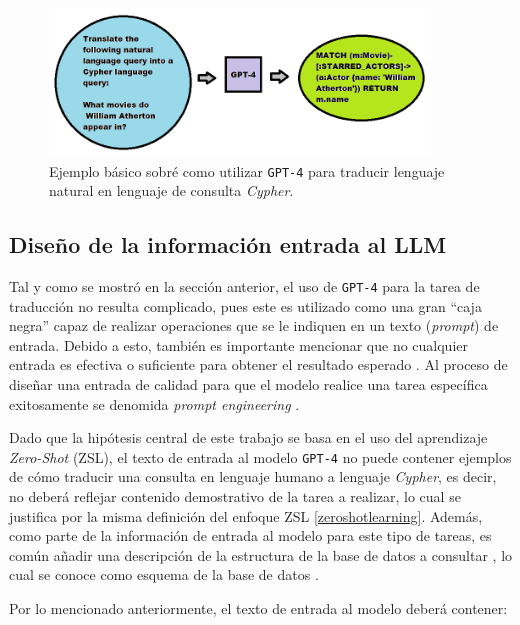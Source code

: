\begin{figure}[H]\label{simplegpt4}
	\centering
	\includegraphics[width = 0.9\textwidth]{./Graphics/simplegpt4use}
	\caption{Ejemplo básico sobré como utilizar \texttt{GPT-4} para traducir lenguaje natural en lenguaje de consulta \textit{Cypher}.}
\end{figure}

\subsection{Diseño de la información entrada al LLM} \label{prompt_design}

Tal y como se mostró en la sección anterior, el uso de \texttt{GPT-4} para la tarea de traducción no resulta complicado, pues este es utilizado como una gran ``caja negra'' capaz de realizar operaciones que se le indiquen en un texto (\textit{prompt}) de entrada. Debido a esto, también es importante mencionar que no cualquier entrada es efectiva o suficiente para obtener el resultado esperado \cite{promtpengineeringeffectiveness}. Al proceso de diseñar una entrada de calidad para que el modelo realice una tarea específica exitosamente se denomida \textit{prompt engineering} \cite{promptengineering}. 

Dado que la hipótesis central de este trabajo se basa en el uso del aprendizaje \textit{Zero-Shot} (ZSL), el texto de entrada al modelo \texttt{GPT-4} no puede contener ejemplos de cómo traducir una consulta en lenguaje humano a lenguaje \textit{Cypher}, es decir, no deberá reflejar contenido demostrativo de la tarea a realizar, lo cual se justifica por la misma definición del enfoque ZSL \ref{zeroshotlearning}. Además, como parte de la información de entrada al modelo para este tipo de tareas, es común añadir una descripción de la estructura de la base de datos a consultar \cite{samplepromptsnl2ql1} \cite{samplepromptsnl2ql2}, lo cual se conoce como esquema de la base de datos \cite{dbschema}. 

Por lo mencionado anteriormente, el texto de entrada al modelo deberá contener:

